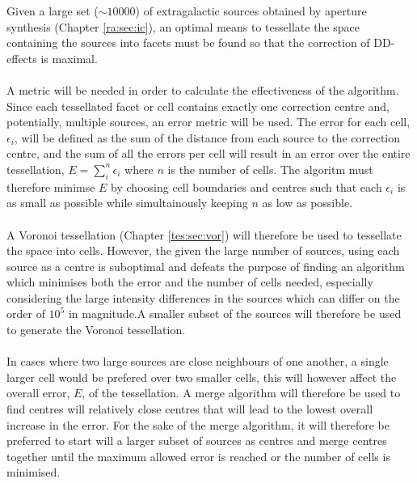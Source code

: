 Given a large set ($\sim10000$) of extragalactic sources obtained by aperture synthesis (Chapter \ref{ra:sec:ic}), an optimal means to tessellate the space containing the sources into facets must be found so that the correction of DD-effects is maximal.
\\
\\
A metric will be needed in order to calculate the effectiveness of the algorithm. Since each tessellated facet or cell contains exactly one correction centre and, potentially, multiple sources, an error metric will be used. The error for each cell, $\epsilon_i$, will be defined as the sum of the distance from each source to the correction centre, and the sum of all the errors per cell will result in an error over the entire tessellation, $E = \sum^n_i \epsilon_i$ where $n$ is the number of cells. The algoritm must therefore minimse $E$ by choosing cell boundaries and centres such that each $\epsilon_i$ is as small as possible while simultainously keeping $n$ as low as possible.
\\
\\
A Voronoi tessellation (Chapter \ref{tes:sec:vor}) will therefore be used to tessellate the space into cells. However, the given the large number of sources, using each source as a centre is suboptimal and defeats the purpose of finding an algorithm which minimises both the error and the number of cells needed, especially considering the large intensity differences in the sources which can differ on the order of $10^5$ in magnitude.A smaller subset of the sources will therefore be used to generate the Voronoi tessellation.
\\
\\
In cases where two large sources are close neighbours of one another, a single larger cell would be prefered over two smaller cells, this will however affect the overall error, $E$, of the tessellation. A merge algorithm will therefore be used to find centres will relatively close centres that will lead to the lowest overall increase in the error. For the sake of the merge algorithm, it will therefore be preferred to start will a larger subset of sources as centres and merge centres together until the maximum allowed error is reached or the number of cells is minimised.
